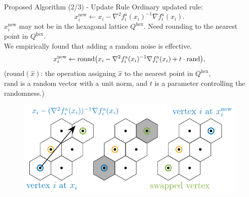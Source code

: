 \documentclass[dvipdfmx,13pt,aspectratio=169]{beamer}
\newif\ifShowHidden
\begin{document}
\begin{frame}{Proposed Algorithm (2/3) - Update Rule}
  Ordinary updated rule:
  \begin{equation*}
    x_i^\mathrm{new} \gets x_i - \nabla^2 f^{\mathrm{a}}_i(x_i)^{-1} \nabla f^{\mathrm{a}}_i(x_i).
  \end{equation*}
  $x_i^\mathrm{new}$ may not be in the hexagonal lattice $Q^\mathrm{hex}$.
  Need rounding to the nearest point in $Q^\mathrm{hex}$.\\
  We empirically found that adding a random noise is effective.
  \begin{equation*}
    x_i^\mathrm{new} \gets \mathrm{round}\qty(x_i - \nabla^2 f^{\mathrm{a}}_i(x_i)^{-1} \nabla f^{\mathrm{a}}_i(x_i) + t \cdot \text{rand}),
  \end{equation*}
  ($\mathrm{round}(\hat{x})$: the operation assigning $\hat{x}$ to the nearest point in $Q^\mathrm{hex}$,\\
  $\mathrm{rand}$ is a random vector with a unit norm, and $t$ is a parameter controlling the randomness.)

  \begin{figure}[t]
    \centering
    \includegraphics[width=0.5\columnwidth]{../main/hex/hex.pdf}
    \label{fig:hex}
  \end{figure}
\end{frame}
\end{document}
